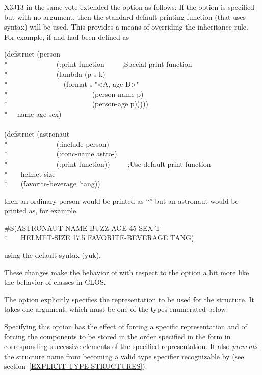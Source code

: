 \begin{flushdesc}
\begin{new}
X3J13 in the same vote extended the  option
as follows: If the  option is specified but with
no argument, then the standard default printing function (that uses
 syntax) will be used.  This provides a means of overriding the
inheritance rule.  For example, if  and 
had been defined as
\begin{lisp}
(defstruct (person \\*
~~~~~~~~~~~~~(:print-function~~~~~;\textrm{Special print function}\\*
~~~~~~~~~~~~~(lambda (p s k) \\*
~~~~~~~~~~~~~~~(format s "<{\Xtilde}A, age {\Xtilde}D>" \\*
~~~~~~~~~~~~~~~~~~~~~~~(person-name p) \\*
~~~~~~~~~~~~~~~~~~~~~~~(person-age p))))) \\*
~~name age sex) \\
\\
(defstruct (astronaut \\*
~~~~~~~~~~~~~(:include person) \\*
~~~~~~~~~~~~~(:conc-name astro-) \\*
~~~~~~~~~~~~~(:print-function))~~~~~;\textrm{Use default print function} \\*
~~~helmet-size \\*
~~~(favorite-beverage 'tang))
\end{lisp}
then an ordinary person would be printed as ``''
but an astronaut would be printed as, for example,
\begin{lisp}
\#S(ASTRONAUT NAME BUZZ AGE 45 SEX T \\*
~~~HELMET-SIZE 17.5 FAVORITE-BEVERAGE TANG)
\end{lisp}
using the default  syntax (yuk).

These changes make the behavior of  with respect to the
 option a bit more like the behavior of classes in CLOS.
\end{new}

\item[\cd{:type}]
The  option explicitly specifies the representation to be used for
the structure.  It takes one argument, which must
be one of the types enumerated below.

Specifying this option has the effect of forcing
a specific representation and of forcing the components to be
stored in the order specified in the  form
in corresponding successive elements of the specified representation.
It also \emph{prevents} the structure name from becoming a valid
type specifier recognizable by 
(see section~\ref{EXPLICIT-TYPE-STRUCTURES}).


\end{flushdesc}
